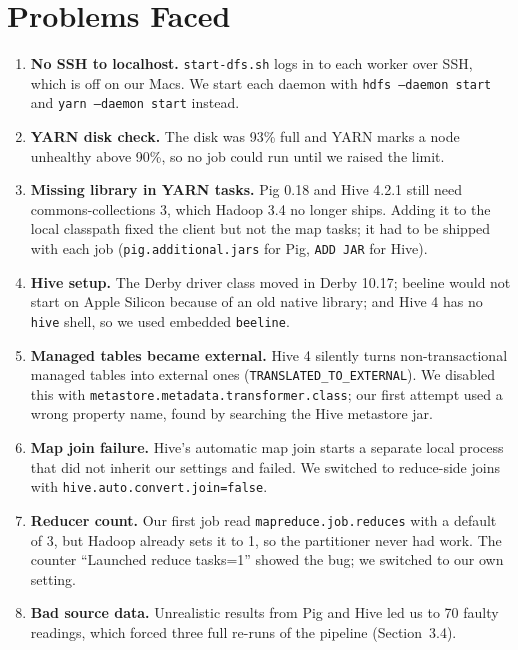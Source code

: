 \documentclass[12pt,a4paper]{report}
\begin{document}
\chapter{Problems Faced}\label{ch:problems}
\begin{enumerate}
\item \textbf{No SSH to localhost.} \texttt{start-dfs.sh} logs in to each worker over SSH, which is off on our Macs. We start each daemon with \texttt{hdfs --daemon start} and \texttt{yarn --daemon start} instead.
\item \textbf{YARN disk check.} The disk was 93\% full and YARN marks a node unhealthy above 90\%, so no job could run until we raised the limit.
\item \textbf{Missing library in YARN tasks.} Pig 0.18 and Hive 4.2.1 still need commons-collections 3, which Hadoop 3.4 no longer ships. Adding it to the local classpath fixed the client but not the map tasks; it had to be shipped with each job (\texttt{pig.additional.jars} for Pig, \texttt{ADD JAR} for Hive).
\item \textbf{Hive setup.} The Derby driver class moved in Derby 10.17; beeline would not start on Apple Silicon because of an old native library; and Hive 4 has no \texttt{hive} shell, so we used embedded \texttt{beeline}.
\item \textbf{Managed tables became external.} Hive 4 silently turns non-transactional managed tables into external ones (\texttt{TRANSLATED\_TO\_EXTERNAL}). We disabled this with \texttt{metastore.metadata.transformer.class}; our first attempt used a wrong property name, found by searching the Hive metastore jar.
\item \textbf{Map join failure.} Hive's automatic map join starts a separate local process that did not inherit our settings and failed. We switched to reduce-side joins with \texttt{hive.auto.convert.join=false}.
\item \textbf{Reducer count.} Our first job read \texttt{mapreduce.job.reduces} with a default of 3, but Hadoop already sets it to 1, so the partitioner never had work. The counter ``Launched reduce tasks=1'' showed the bug; we switched to our own setting.
\item \textbf{Bad source data.} Unrealistic results from Pig and Hive led us to 70 faulty readings, which forced three full re-runs of the pipeline (Section~3.4).
\end{enumerate}
\end{document}

